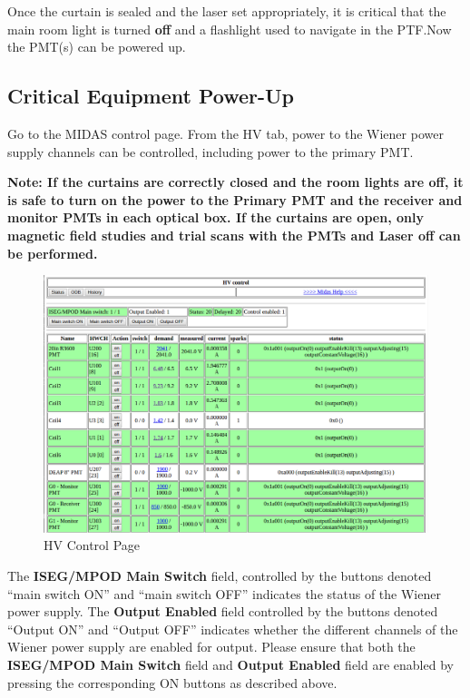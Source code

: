 \documentclass[twoside,letterpaper]{refart}
\begin{document}
Once the curtain is sealed and the laser set appropriately, it is critical that the main room light is turned \textbf{off} and a flashlight used to navigate in the PTF.\@ Now the PMT(s) can be powered up.

\clearpage

\subsection{Critical Equipment Power-Up}\label{PowerUP}

Go to the MIDAS control page. From the HV tab, power to the Wiener power supply channels can be controlled, including power to the primary PMT.

\textbf{Note: If the curtains are correctly closed and the room lights are off, it is safe to turn on the power to the Primary PMT and the receiver and monitor PMTs in each optical box. If the curtains are open, only magnetic field studies and trial scans with the PMTs and Laser off can be performed.}

\FloatBarrier

\begin{figure}[!htpb]\centering	
	\includegraphics[width=\textwidth]{images/HVPage}
	\caption{HV Control Page\label{HVPage}}
\end{figure}

\FloatBarrier

The \textbf{ISEG/MPOD Main Switch} field, controlled by the buttons denoted ``main switch ON'' and ``main switch OFF'' indicates the status of the Wiener power supply. The \textbf{Output Enabled} field controlled by the buttons denoted ``Output ON'' and ``Output OFF'' indicates whether the different channels of the Wiener power supply are enabled for output. Please ensure that both the \textbf{ISEG/MPOD Main Switch} field and \textbf{Output Enabled} field are enabled by pressing the corresponding ON buttons as described above.
\end{document}

